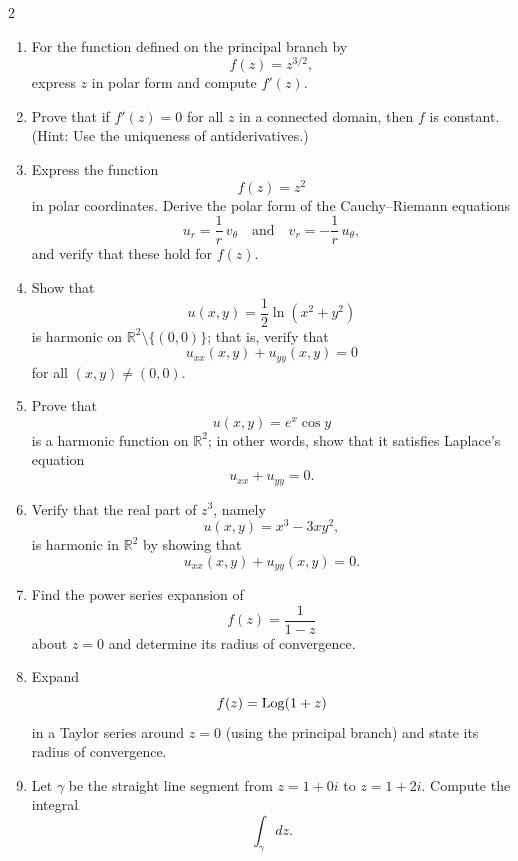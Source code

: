 \begin{multicols}{2}
\begin{enumerate}
\begin{enumerate}
 \item  \(
  f(z)=\sin\bigl(e^z\bigr).
  \)

 \item  \(
  f(z)=z^3+2z^2-3z+1
  \)
\end{enumerate}

  \item For the function defined on the principal branch by
  \[
  f(z)=z^{3/2},
  \]
  express \(z\) in polar form and compute \(f'(z)\).

  \item Prove that if \(f'(z)=0\) for all \(z\) in a connected domain, then \(f\) is constant. (Hint: Use the uniqueness of antiderivatives.)

\item Express the function
\[
f(z)=z^2
\]
in polar coordinates. Derive the polar form of the Cauchy–Riemann equations
\[
u_r=\frac{1}{r}\,v_\theta \quad \text{and} \quad v_r=-\frac{1}{r}\,u_\theta,
\]
and verify that these hold for \(f(z)\).

  \item
    Show that
    \[
    u(x,y)=\frac{1}{2}\ln(x^2+y^2)
    \]
    is harmonic on \(\mathbb{R}^2\setminus\{(0,0)\}\); that is, verify that 
    \[
    u_{xx}(x,y)+u_{yy}(x,y)=0
    \]
    for all \((x,y)\neq(0,0)\).

  \item
    Prove that
    \[
    u(x,y)=e^x\cos y
    \]
    is a harmonic function on \(\mathbb{R}^2\); in other words, show that it satisfies Laplace’s equation
    \[
    u_{xx}+u_{yy}=0.
    \]

  \item
    Verify that the real part of \(z^3\), namely
    \[
    u(x,y)=x^3-3xy^2,
    \]
    is harmonic in \(\mathbb{R}^2\) by showing that 
    \[
    u_{xx}(x,y)+u_{yy}(x,y)=0.
    \]

  \item
    Find the power series expansion of
    \[
    f(z)=\frac{1}{1-z}
    \]
    about \(z=0\) and determine its radius of convergence.

  \item 
    Expand
    \[
    f(z)=\operatorname{Log}(1+z)
    \]
    in a Taylor series around \(z=0\) (using the principal branch) and state its radius of convergence.


  \item Let \(\gamma\) be the straight line segment from \(z=1+0i\) to \(z=1+2i\). Compute the integral
  \[
  \int_{\gamma} dz.
  \]
 

\end{enumerate}
\end{multicols}
